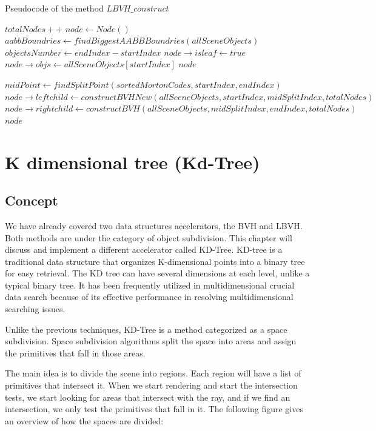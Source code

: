 \documentclass[11pt,a4paper]{article}
\begin{document}
\begin{algorithm}[H]
\caption{Pseudocode of the method $LBVH\_construct$}\label{alg:alg1}
\begin{algorithmic}
\State $totalNodes++$
\State $node \gets Node()$
\State $aabbBoundries \gets findBiggestAABBBoundries(allSceneObjects)$
\State $objectsNumber \gets  endIndex - startIndex$
	\State $node \rightarrow isleaf \gets true$
	\State $node \rightarrow objs \gets allSceneObjects[startIndex]$
	\State \Return $node$
\EndIf

\State $midPoint \gets findSplitPoint(sortedMortonCodes, startIndex, endIndex)$
\State $node \rightarrow leftchild  \gets constructBVHNew(allSceneObjects, startIndex, midSplitIndex, totalNodes)$
\State $node \rightarrow rightchild  \gets constructBVH(allSceneObjects, midSplitIndex, endIndex, totalNodes)$
\State \Return $node$
\EndFunction
\end{algorithmic}
\end{algorithm}
\clearpage



\section{K dimensional tree (Kd-Tree)}
\subsection{Concept}
We have already covered two data structures accelerators, the BVH and LBVH. Both methods are under the category of object subdivision. This chapter will discuss and implement a different accelerator called KD-Tree.
KD-tree is a traditional data structure that organizes K-dimensional points into a binary tree for easy retrieval. The KD tree can have several dimensions at each level, unlike a typical binary tree. It has been frequently utilized in multidimensional crucial data search because of its effective performance in resolving multidimensional searching issues.

  Unlike the previous techniques, KD-Tree is a method categorized as a space subdivision.
Space subdivision algorithms split the space into areas and assign the primitives that fall in those areas.


The main idea is to divide the scene into regions. Each region will have a list of primitives that intersect it. When we start rendering and start the intersection tests, we start looking for areas that intersect with the ray, and if we find an intersection, we only test the primitives that fall in it.
The following figure gives an overview of how the spaces are divided: 
\end{document}
